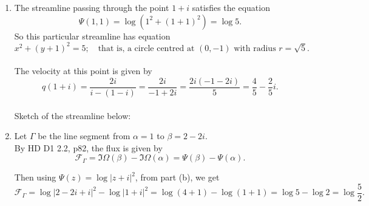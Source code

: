 \begin{enumerate}[label=(\alph*)]
  and since on the streamlines, $\Psi(z) = k$, for $k \in \mathbb{R}$, we have
  \vs \\
  \[
  \Psi(x,y) = \log\left(x^2 + (y + 1)^2\right) = k \quad \Rightarrow \quad x^2 + (y + 1)^2 = e^k.
  \]
  \vs \\
  Finally, putting $e^k = K > 0$, we get equations for the streamlines of the flow, in $x$ and $y$:
  \vs \\
  \[
  x^2 + (y + 1)^2 = K,\quad K > 0. \quad \text{These are circles centred at the point $(0, -1)$.}
  \]
  \newpage
  \item %
  The streamline passing through the point $1 + i$ satisfies the equation
  \vs
  \[
  \Psi(1,1) = \log\left(1^2 + (1 + 1)^2\right) = \log 5.
  \]
  So this particular streamline has equation
  \vs
  \[
  x^2 + (y + 1)^2 = 5;\quad \text{that is, a circle centred at $(0,-1)$ with radius $r = \sqrt{5}$}.
  \]
  \vs \\
  The velocity at this point is given by
  \[
  q(1 + i) = \frac{2i}{i - (1 - i)} = \frac{2i}{-1 + 2i} = \frac{2i(-1 - 2i)}{5} = \frac{4}{5} - \frac{2}{5}i.
  \]
  \vs \\
  Sketch of the streamline below:

  \begin{figure}[htbp]
    \centering
    
  \end{figure}
  \vs

  \item %
  Let $\Gamma$ be the line segment from $\alpha = 1$ to $\beta = 2 - 2i$.
  \vs \\
  By HD D1 2.2, p82, the flux is given by
  \[
  \mathcal{F}_\Gamma = \Im \Omega(\beta) - \Im \Omega(\alpha) = \Psi(\beta) - \Psi(\alpha).
  \]

  Then using $\Psi(z) = \log\left| z + i\right|^2$, from part (b), we get
  \[
  \mathcal{F}_\Gamma = \log \left| 2 - 2i + i\right|^2 - \log\left| 1 + i\right|^2 = \log( 4 + 1) - \log(1 + 1) = \log 5 - \log 2 = \log\frac{5}{2}.
  \]
\end{enumerate}
\newpage
